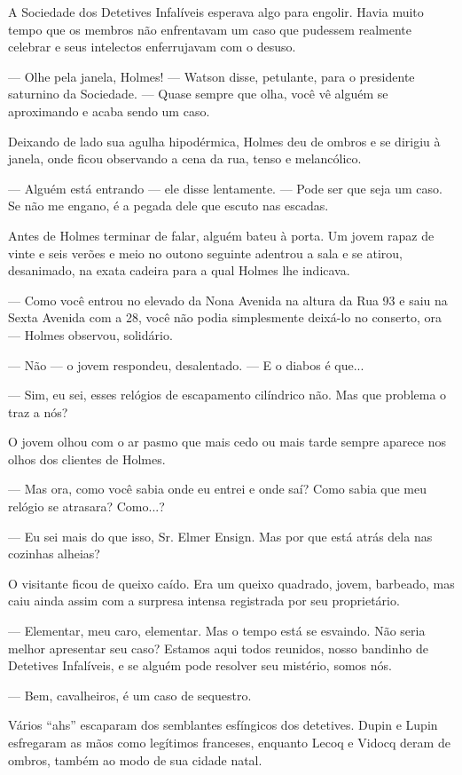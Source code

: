 
A Sociedade dos Detetives Infalíveis esperava algo para engolir. Havia
muito tempo que os membros não enfrentavam um caso que pudessem
realmente celebrar e seus intelectos enferrujavam com o desuso.

--- Olhe pela janela, Holmes! --- Watson disse, petulante, para o
presidente saturnino da Sociedade. --- Quase sempre que olha, você vê
alguém se aproximando e acaba sendo um caso.

Deixando de lado sua agulha hipodérmica, Holmes deu de ombros e se
dirigiu à janela, onde ficou observando a cena da rua, tenso e
melancólico.

--- Alguém está entrando --- ele disse lentamente. --- Pode ser que seja
um caso. Se não me engano, é a pegada dele que escuto nas escadas.

Antes de Holmes terminar de falar, alguém bateu à porta. Um jovem rapaz
de vinte e seis verões e meio no outono seguinte adentrou a sala e se
atirou, desanimado, na exata cadeira para a qual Holmes lhe indicava.

--- Como você entrou no elevado da Nona Avenida na altura da Rua 93 e
saiu na Sexta Avenida com a 28, você não podia simplesmente deixá-lo no
conserto, ora --- Holmes observou, solidário.

--- Não --- o jovem respondeu, desalentado. --- E o diabos é que...

--- Sim, eu sei, esses relógios de escapamento cilíndrico não. Mas que
problema o traz a nós?

O jovem olhou com o ar pasmo que mais cedo ou mais tarde sempre aparece
nos olhos dos clientes de Holmes.

--- Mas ora, como você sabia onde eu entrei e onde saí? Como sabia que
meu relógio se atrasara? Como...?

--- Eu sei mais do que isso, Sr. Elmer Ensign. Mas por que está atrás
dela nas cozinhas alheias?

O visitante ficou de queixo caído. Era um queixo quadrado, jovem,
barbeado, mas caiu ainda assim com a surpresa intensa registrada por seu
proprietário.

--- Elementar, meu caro, elementar. Mas o tempo está se esvaindo. Não
seria melhor apresentar seu caso? Estamos aqui todos reunidos, nosso
bandinho de Detetives Infalíveis, e se alguém pode resolver seu
mistério, somos nós.

--- Bem, cavalheiros, é um caso de sequestro.

Vários ``ahs'' escaparam dos semblantes esfíngicos dos detetives. Dupin
e Lupin esfregaram as mãos como legítimos franceses, enquanto Lecoq e
Vidocq deram de ombros, também ao modo de sua cidade natal.

